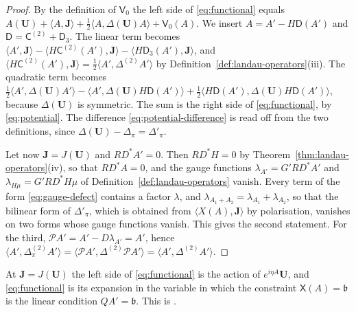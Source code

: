 \documentclass[11pt]{preprint}
\numberwithin{equation}{section}
\begin{document}
\begin{proof}
By the definition of $\mathsf V_0$ the left side of \eqref{eq:functional} equals $A(\mathbf U) + \langle A, \mathbf J\rangle + \frac{1}{2}\langle A, \Delta(\mathbf U)A\rangle + \mathsf V_0(A)$. We insert $A = A' - H\mathsf D(A')$ and $\mathsf D = \mathsf C^{(2)} + \mathsf D_3$. The linear term becomes $\langle A', \mathbf J\rangle - \langle H\mathsf C^{(2)}(A'), \mathbf J\rangle - \langle H\mathsf D_3(A'), \mathbf J\rangle$, and $\langle H\mathsf C^{(2)}(A'), \mathbf J\rangle = \frac{1}{2}\langle A', \Delta^{(2)}A'\rangle$ by Definition~\ref{def:landau-operators}(iii). The quadratic term becomes $\frac{1}{2}\langle A', \Delta(\mathbf U)A'\rangle - \langle A', \Delta(\mathbf U)H\mathsf D(A')\rangle + \frac{1}{2}\langle H\mathsf D(A'), \Delta(\mathbf U)H\mathsf D(A')\rangle$, because $\Delta(\mathbf U)$ is symmetric. The sum is the right side of \eqref{eq:functional}, by \eqref{eq:potential}. The difference \eqref{eq:potential-difference} is read off from the two definitions, since $\Delta(\mathbf U) - \Delta_\pi = \Delta'_\pi$.

Let now $\mathbf J = J(\mathbf U)$ and $RD^*A' = 0$. Then $RD^*H = 0$ by Theorem~\ref{thm:landau-operators}(iv), so that $RD^*A = 0$, and the gauge functions $\lambda_{A'} = G'RD^*A'$ and $\lambda_{H\mu} = G'RD^*H\mu$ of Definition~\ref{def:landau-operators} vanish. Every term of the form \eqref{eq:gauge-defect} contains a factor $\lambda$, and $\lambda_{A_1 + A_2} = \lambda_{A_1} + \lambda_{A_2}$, so that the bilinear form of $\Delta'_\pi$, which is obtained from $\langle X(A), \mathbf J\rangle$ by polarisation, vanishes on two forms whose gauge functions vanish. This gives the second statement. For the third, $\mathcal PA' = A' - D\lambda_{A'} = A'$, hence $\langle A', \Delta^{(2)}_\pi A'\rangle = \langle\mathcal PA', \Delta^{(2)}\mathcal PA'\rangle = \langle A', \Delta^{(2)}A'\rangle$.
\end{proof}

At $\mathbf J = J(\mathbf U)$ the left side of \eqref{eq:functional} is the action of $e^{i\eta A}\mathbf U$, and \eqref{eq:functional} is its expansion in the variable in which the constraint $\mathsf X(A) = \mathfrak b$ is the linear condition $QA' = \mathfrak b$. This is \cite[(74)--(81), pp.~289--290]{BalabanVAR}.
\end{document}
